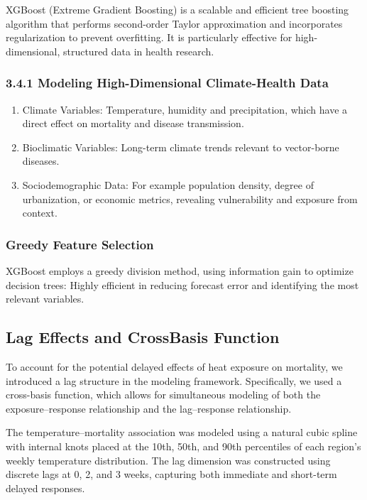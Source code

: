 \documentclass[
]{krantz}
\begin{document}
XGBoost (Extreme Gradient Boosting) is a scalable and efficient tree boosting algorithm that performs second-order Taylor approximation and incorporates regularization to prevent overfitting. It is particularly effective for high-dimensional, structured data in health research.\citep{chen2016xgboost}

\subsubsection{3.4.1 Modeling High-Dimensional Climate-Health Data}\label{modeling-high-dimensional-climate-health-data}

\begin{enumerate}
\def\labelenumi{\arabic{enumi}.}
\item
  Climate Variables: Temperature, humidity and precipitation, which have a direct effect on mortality and disease transmission.
\item
  Bioclimatic Variables: Long-term climate trends relevant to vector-borne diseases.
\item
  Sociodemographic Data: For example population density, degree of urbanization, or economic metrics, revealing vulnerability and exposure from context.
\end{enumerate}

\subsubsection{Greedy Feature Selection}\label{greedy-feature-selection}

XGBoost employs a greedy division method, using information gain to optimize decision trees:
Highly efficient in reducing forecast error and identifying the most relevant variables.

\subsection{Lag Effects and CrossBasis Function}\label{lag-effects-and-crossbasis-function}

To account for the potential delayed effects of heat exposure on mortality, we introduced a lag structure in the modeling framework. Specifically, we used a cross-basis function, which allows for simultaneous modeling of both the exposure--response relationship and the lag--response relationship.

The temperature--mortality association was modeled using a natural cubic spline with internal knots placed at the 10th, 50th, and 90th percentiles of each region's weekly temperature distribution. The lag dimension was constructed using discrete lags at 0, 2, and 3 weeks, capturing both immediate and short-term delayed responses.
\end{document}
